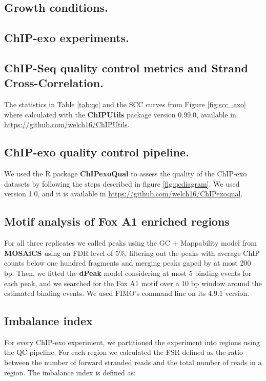 \documentclass{bmcart}\usepackage[]{graphicx}\usepackage[]{color}
\begin{document}
\subsection*{Growth conditions.}

\subsection*{ChIP-exo experiments.}

\subsection*{ChIP-Seq quality control metrics and Strand
  Cross-Correlation.}

The statistics in Table \ref{tab:qc} and the SCC curves from Figure
\ref{fig:scc_exo} where calculated with the \textbf{ChIPUtils} package
version 0.99.0, available in
\url{https://github.com/welch16/ChIPUtils}.


\subsection*{ChIP-exo quality control pipeline.}

We used the R package \textbf{ChIPexoQual} to assess the quality of
the ChIP-exo datasets by following the steps described in figure
\ref{fig:qcdiagram}. We used version 1.0, and it is available in
\url{https://github.com/welch16/ChIPexoqual}.

\subsection*{Motif analysis of Fox A1 enriched regions}

For all three replicates we called peaks using the GC + Mappability
model from \textbf{MOSAiCS} using an FDR level of 5\%, filtering out
the peaks with average ChIP counts below one hundred fragments and
merging peaks gaped by at most 200 bp. Then, we fitted the
\textbf{dPeak} model considering at most 5 binding events for each
peak, and we searched for the Fox A1 motif over a 10 bp window around
the estimated binding events. We used FIMO's command line on its 4.9.1
version.

\subsection*{Imbalance index}

For every ChIP-exo experiment, we partitioned the experiment into
regions using the QC pipeline. For each region we calculated the FSR
defined as the ratio between the number of forward stranded reads and
the total number of reads in a region. The imbalance index is defined
as:
\end{document}
